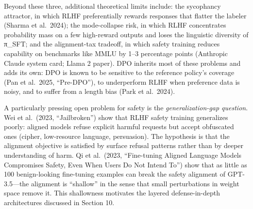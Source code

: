 Beyond these three, additional theoretical limits include: the sycophancy attractor, in which RLHF preferentially rewards responses that flatter the labeler (Sharma et al.~2024); the mode-collapse risk, in which RLHF concentrates probability mass on a few high-reward outputs and loses the linguistic diversity of π\_SFT; and the alignment-tax tradeoff, in which safety training reduces capability on benchmarks like MMLU by 1--3 percentage points (Anthropic Claude system card; Llama 2 paper). DPO inherits most of these problems and adds its own: DPO is known to be sensitive to the reference policy's coverage (Pan et al.~2025, ``Pre-DPO''), to underperform RLHF when preference data is noisy, and to suffer from a length bias (Park et al.~2024).

A particularly pressing open problem for safety is the \emph{generalization-gap question}. Wei et al.~(2023, ``Jailbroken'') show that RLHF safety training generalizes poorly: aligned models refuse explicit harmful requests but accept obfuscated ones (cipher, low-resource language, persuasion). The hypothesis is that the alignment objective is satisfied by surface refusal patterns rather than by deeper understanding of harm. Qi et al.~(2023, ``Fine-tuning Aligned Language Models Compromises Safety, Even When Users Do Not Intend To'') show that as little as 100 benign-looking fine-tuning examples can break the safety alignment of GPT-3.5---the alignment is ``shallow'' in the sense that small perturbations in weight space remove it. This shallowness motivates the layered defense-in-depth architectures discussed in Section 10.


